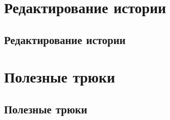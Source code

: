 \documentclass[presentation]{beamer}
\begin{document}


\section{Редактирование истории}

\subsection{Редактирование истории}



\section{Полезные трюки}

\subsection{Полезные трюки}
\end{document}
